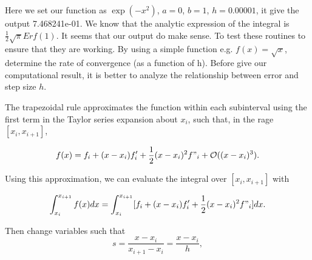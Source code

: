 \documentclass{article}
\begin{document}
Here we set our function as $\exp(-x^2)$, $a = 0$, $b = 1$, $h = 0.00001$, it give the output 7.468241e-01. We know that the analytic expression of the integral is $\frac{1}{2}\sqrt{\pi}Erf(1)$. It seems that our output do make sense.  To test these routines to ensure that they are working. By using a simple function e.g. $f(x) = \sqrt{x}$, determine the rate of convergence (as a function of h). Before give our computational result, it is better to analyze the relationship between error and step size $h$.

The trapezoidal rule approximates the function within each subinterval using the first term in the Taylor series expansion about $x_i$, such that, in the rage $[x_i, x_{i+1}]$,

\begin{equation}
f(x) = f_i + (x - x_i)f'_i + \frac{1}{2}(x - x_i)^2 f"_i + \mathcal{O}((x - x_i)^3).
\end{equation}

Using this approximation, we can evaluate the integral over $[x_i, x_{i+1}]$ with

\begin{equation}
\int_{x_i}^{x_{i+1}} f(x) dx = \int_{x_i}^{x_{i+1}} [f_i + (x - x_i)f'_i + \frac{1}{2}(x - x_i)^2 f"_i]dx.
\end{equation}

Then change variables such that 
\begin{equation}
s = \frac{x - x_i}{x_{i+1} - x_i} = \frac{x - x_i}{h},
\end{equation}
\end{document}
